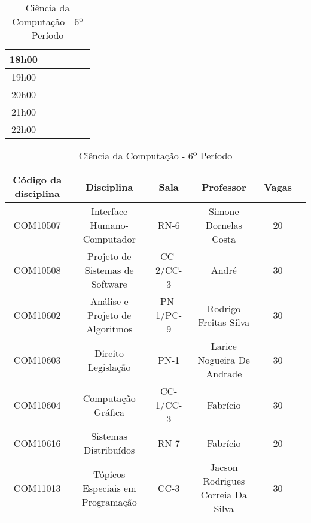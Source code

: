 \begin{apendices}
\begin{table}[!h]
\begin{adjustbox}{width=1\textwidth,center=\textwidth}
\begin{tabular}{|c|c|c|c|c|c|}
18h00 &  &  &  &  &  \\ \hline
19h00 &  &  &  &  &  \\ \hline
20h00 &  &  &  &  &  \\ \hline
21h00 &  &  &  &  &  \\ \hline
22h00 &  &  &  &  &  \\ \hline

\end{tabular}
\end{adjustbox}
\begin{adjustbox}{width=1\textwidth,center=\textwidth}
\centering
\begin{tabular}{|c|c|c|c|c|c|}
\hline
\textbf{Código da disciplina} & \textbf{Disciplina} & \textbf{Sala} & \textbf{Professor} & \textbf{Vagas} \\ \hline
COM10507 & Interface Humano-Computador & RN-6 & Simone Dornelas Costa & 20 \\ \hline
COM10508 & Projeto de Sistemas de Software & CC-2/CC-3 & André & 30 \\ \hline
COM10602 & Análise e Projeto de Algoritmos & PN-1/PC-9 & Rodrigo Freitas Silva & 30 \\ \hline
COM10603 & Direito Legislação & PN-1 & Larice Nogueira De Andrade & 30 \\ \hline
COM10604 & Computação Gráfica & CC-1/CC-3 & Fabrício & 30 \\ \hline
COM10616 & Sistemas Distribuídos & RN-7 & Fabrício & 20 \\ \hline
COM11013 & Tópicos Especiais em Programação & CC-3 & Jacson Rodrigues Correia Da Silva & 30 \\ \hline

\end{tabular}
\end{adjustbox}
\caption{Ciência da Computação - 6º Período}
\end{table}



\end{apendices}

